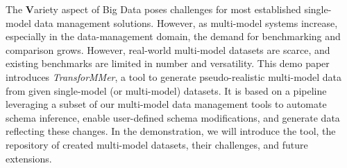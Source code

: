 The \textbf{V}ariety aspect of Big Data poses challenges for most established single-model data management solutions. However, as multi-model systems increase, especially in the data-management domain, the demand for benchmarking and comparison grows. However, real-world multi-model datasets are scarce, and existing benchmarks are limited in number and versatility.
This demo paper introduces \textit{TransforMMer}, a tool to generate pseudo-realistic multi-model data from given single-model (or multi-model) datasets. It is based on a pipeline leveraging a subset of our multi-model data management tools to automate schema inference, enable user-defined schema modifications, and generate data reflecting these changes. In the demonstration, we will introduce the tool, the repository of created multi-model datasets, their challenges, and future extensions.










